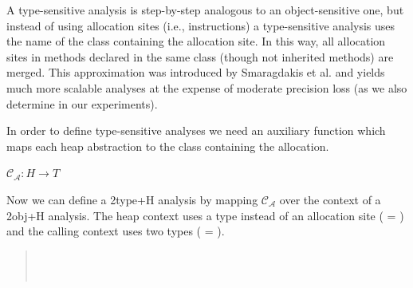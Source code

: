 A type-sensitive analysis is step-by-step analogous to an
object-sensitive one, but instead of using allocation sites (i.e.,
instructions) a type-sensitive analysis uses the name of the class
containing the allocation site. In this way, all allocation sites in
methods declared in the same class (though not inherited methods) are
merged. This approximation was introduced by Smaragdakis et
al. \cite{popl:2011:Smaragdakis} and yields much more scalable analyses at
the expense of moderate precision loss (as we also determine in our
experiments).

In order to define type-sensitive analyses we need an auxiliary
function which maps each heap abstraction to the class containing the
allocation.

$\mathcal{C_A}: H \rightarrow T$

Now we can define a 2type+H analysis by mapping $\mathcal{C_A}$
over the context of a 2obj+H analysis. The heap context uses a type instead of an
allocation site ( = ) and the calling context uses two types
( = ).
\begin{quote}
 \\
 \\
\end{quote}





